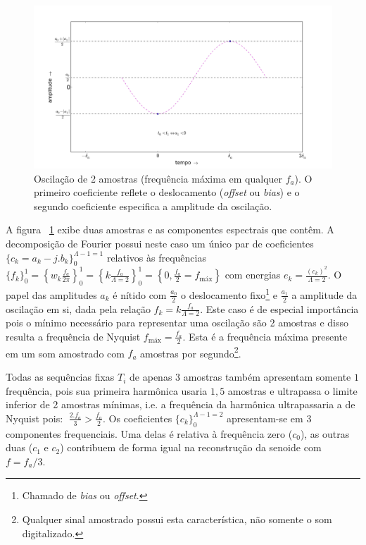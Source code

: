 \begin{figure}[h!]
    \centering
        \includegraphics[width=\textwidth]{figuras/amostras2c__}
    \caption{Oscilação de 2 amostras (frequência máxima em qualquer $f_a$). O primeiro coeficiente reflete o deslocamento (\emph{offset} ou \emph{bias}) e o segundo coeficiente especifica a amplitude da oscilação.}
        \label{fig:amostras2}
\end{figure}

A figura ~\ref{fig:amostras2} exibe duas amostras e as componentes espectrais que contêm. A decomposição de Fourier possui neste caso um único par de coeficientes $\{c_k=a_k-j.b_k\}_0^{\Lambda-1=1}$ relativos às frequências $\{f_k\}_0^1=\left\{w_k\frac{f_a}{2\pi}\right\}_0^1=\left\{k\frac{f_a}{\Lambda=2}\right\}_0^1=\left\{0,\frac{f_a}{2}=f_{\text{máx}}\right\}$
com energias $e_k=\frac{(c_k)^2}{\Lambda=2}$. O papel das amplitudes $a_k$ é nítido com
 $\frac{a_0}{2}$ o deslocamento fixo\footnote{Chamado de \emph{bias} ou \emph{offset}.} e $\frac{a_1}{2}$ a amplitude da oscilação em si, dada pela relação $f_k=k \frac{f_a}{\Lambda=2}$.
Este caso é de especial importância pois o mínimo necessário para representar uma oscilação são 2 amostras e disso resulta a frequência de Nyquist $f_{\text{máx}}=\frac{f_a}{2}$. Esta é a frequência máxima presente em um som amostrado com $f_a$ amostras por segundo\footnote{Qualquer sinal amostrado possui esta característica, não somente o som digitalizado.}.

Todas as sequências fixas $T_i$ de apenas $3$ amostras também apresentam
somente $1$ frequência, pois sua primeira harmônica usaria $1,5$ amostras e ultrapassa o limite inferior de 2 amostras mínimas, i.e. a frequência da harmônica ultrapassaria a de Nyquist pois:  $\; \frac{2. f_a}{3} > \frac{f_a}{2} $. 
Os coeficientes $\{c_k\}_0^{\Lambda-1=2}$ apresentam-se em 
3 componentes frequenciais. Uma delas é relativa à frequência zero ($c_0$), as outras duas ($c_1$ e $c_2$) contribuem de forma igual na reconstrução da senoide com $f=f_a/3$.

